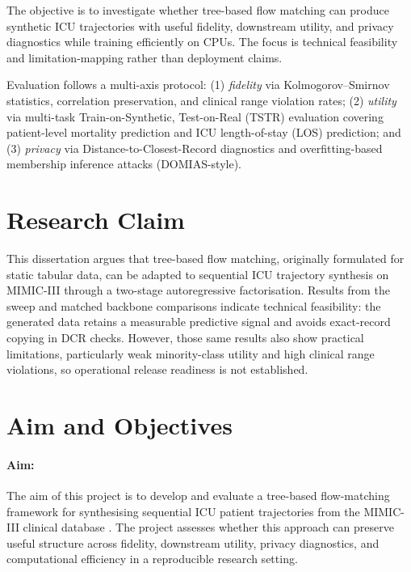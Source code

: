 \documentclass[11pt]{informatics-report}
\begin{document}
The objective is to investigate whether tree-based flow matching can produce synthetic ICU trajectories with useful fidelity, downstream utility, and privacy diagnostics while training efficiently on CPUs. The focus is technical feasibility and limitation-mapping rather than deployment claims.

Evaluation follows a multi-axis protocol: (1) \emph{fidelity} via Kolmogorov--Smirnov statistics, correlation preservation, and clinical range violation rates; (2) \emph{utility} via multi-task Train-on-Synthetic, Test-on-Real (TSTR) evaluation covering patient-level mortality prediction and ICU length-of-stay (LOS) prediction; and (3) \emph{privacy} via Distance-to-Closest-Record diagnostics and overfitting-based membership inference attacks (DOMIAS-style).

\section{Research Claim}

\noindent This dissertation argues that tree-based flow matching, originally formulated for static tabular data, can be adapted to sequential ICU trajectory synthesis on MIMIC-III through a two-stage autoregressive factorisation. Results from the sweep and matched backbone comparisons indicate technical feasibility: the generated data retains a measurable predictive signal and avoids exact-record copying in DCR checks. However, those same results also show practical limitations, particularly weak minority-class utility and high clinical range violations, so operational release readiness is not established.

\section{Aim and Objectives}

\paragraph{Aim:}
The aim of this project is to develop and evaluate a tree-based flow-matching framework for synthesising sequential ICU patient trajectories from the MIMIC-III clinical database \cite{johnson2016mimic}. The project assesses whether this approach can preserve useful structure across fidelity, downstream utility, privacy diagnostics, and computational efficiency in a reproducible research setting.
\end{document}
